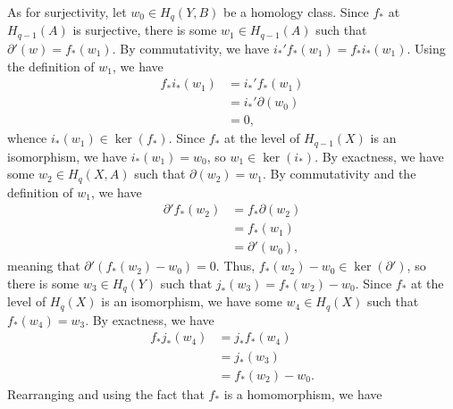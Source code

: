 \documentclass[10pt]{mypackage}
\begin{document}
\begin{solution}
\begin{enumerate}[(a)]
      As for surjectivity, let $w_0\in H_q\left( Y,B \right)$ be a homology class. Since $f_{\ast}$ at $H_{q-1}\left( A \right)$ is surjective, there is some $w_1\in H_{q-1}\left( A \right)$ such that $\partial'\left( w \right) = f_{\ast}\left( w_1 \right)$. By commutativity, we have $i_{\ast}'f_{\ast}\left( w_1 \right) = f_{\ast}i_{\ast}\left( w_1 \right)$. Using the definition of $w_1$, we have
      \begin{align*}
        f_{\ast}i_{\ast}\left( w_1 \right) &= i_{\ast}'f_{\ast}\left( w_1 \right)\\
                                          &= i_{\ast}'\partial\left( w_0 \right)\\
                                          &= 0,
      \end{align*}
      whence $i_{\ast}\left( w_1 \right)\in \ker\left( f_{\ast} \right)$. Since $f_{\ast}$ at the level of $H_{q-1}\left( X \right)$ is an isomorphism, we have $i_{\ast}\left( w_1 \right) = w_0$, so $w_1\in \ker\left( i_{\ast} \right)$. By exactness, we have some $w_2\in H_{q}\left( X,A \right)$ such that $\partial\left( w_2 \right) = w_1$. By commutativity and the definition of $w_1$, we have
      \begin{align*}
        \partial'f_{\ast}\left( w_2 \right) &= f_{\ast}\partial\left( w_2 \right)\\
                                            &= f_{\ast}\left( w_1 \right)\\
                                            &= \partial'\left( w_0 \right),
      \end{align*}
      meaning that $\partial'\left( f_{\ast}\left( w_2 \right)-w_0 \right) = 0$. Thus, $f_{\ast}\left( w_2 \right) - w_0\in \ker\left( \partial' \right)$, so there is some $w_3\in H_q\left( Y \right)$ such that $j_{\ast}\left( w_3 \right) = f_{\ast}\left( w_2 \right) - w_0$. Since $f_{\ast}$ at the level of $H_q\left( X \right)$ is an isomorphism, we have some $w_4\in H_q\left( X \right)$ such that $f_{\ast}\left( w_4 \right) = w_3$. By exactness, we have
      \begin{align*}
        f_{\ast}j_{\ast}\left( w_4 \right) &= j_{\ast}f_{\ast}\left( w_4 \right)\\
                                           &= j_{\ast}\left( w_3 \right)\\
                                           &= f_{\ast}\left( w_2 \right) - w_0.
      \end{align*}
      Rearranging and using the fact that $f_{\ast}$ is a homomorphism, we have

\end{enumerate}
\end{solution}
\end{document}
